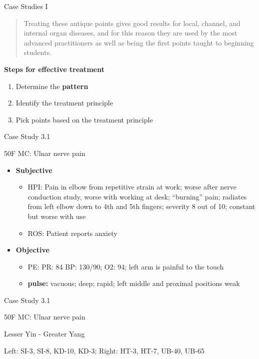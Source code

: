 \begin{frame}{Case Studies I}

\begin{quote}
Treating these antique points gives good results for local, channel, and internal organ diseases, and for this reason they are used by the most advanced practitioners as well as being the first points taught to beginning students.
\end{quote}

\textbf{\large Steps for effective treatment}

\begin{enumerate}
\item Determine the \textbf{pattern}
\item Identify the treatment principle
\item Pick points based on the treatment principle
\end{enumerate}

\end{frame}

\begin{frame}{Case Study 3.1}

50F MC: Ulnar nerve pain

\begin{itemize}
\item \textbf{Subjective}
\begin{itemize}
\item HPI: Pain in elbow from repetitive strain at work; worse after nerve conduction study, worse with working at desk; ``burning'' pain; radiates from left elbow down to 4th and 5th fingers; severity 8 out of 10; constant but worse with use
\item ROS: Patient reports anxiety
\end{itemize}
\item \textbf{Objective}
\begin{itemize}
\item PE: PR: 84 BP: 130/90; O2: 94; left arm is painful to the touch
\item \textbf{pulse:} vacuous; deep; rapid; left middle and proximal positions weak
\end{itemize}
\end{itemize}

\end{frame}

\begin{frame}{Case Study 3.1}

50F MC: Ulnar nerve pain

\begin{as}
Lesser Yin - Greater Yang
\end{as}

\vspace{1em}

\begin{pln}
Left: SI-3, SI-8, KD-10, KD-3; Right: HT-3, HT-7, UB-40, UB-65
\end{pln}

\end{frame}

